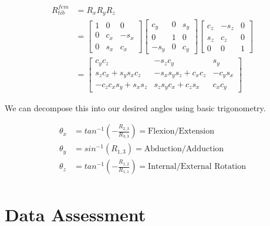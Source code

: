 \documentclass[10pt]{IEEEtran}
\begin{document}
    \begin{equation}
        \begin{aligned}
            R^{fem}_{tib} & = R_{x}R_{y}R_{z}\\
            &= \begin{bmatrix}1 & 0 & 0 \\ 0 & c_{x} & -s_{x} \\ 0 & s_{x} & c_{x} \end{bmatrix}
            \begin{bmatrix}c_{y} & 0 & s_{y}\\ 0 & 1 & 0 \\ -s_{y} & 0 & c_{y} \end{bmatrix}
            \begin{bmatrix} c_{z} & -s_{z} & 0 \\ s_{z} & c_{z} & 0 \\ 0 & 0 & 1 \end{bmatrix}\\
            &= \begin{bmatrix}
                c_{y}c_{z} & -s_{z}c_{y} & s_{y} \\
                s_{z}c_{x} + s_{y}s_{x}c_{z} & -s_{x}s_{y}s_{z} + c_{x}c_{z} & -c_{y}s_{x} \\
                -c_{z}c_{x}s_{y} + s_{x}s_{z} & s_{z}s_{y}c_{x} + c_{z}s_{x}  & c_{x}c_{y}
            \end{bmatrix}
        \end{aligned}
        \label{rot}
    \end{equation}

    We can decompose this into our desired angles using basic trigonometry.

    \begin{equation}
        \begin{aligned}
            \theta_{x} & = tan^{-1}(-\frac{R_{2,3}}{R_{3,3}}) = \text{Flexion/Extension}\\
            \theta_{y} &= sin^{-1}(R_{1,3}) = \text{Abduction/Adduction} \\
            \theta_{z} & = tan^{-1}(-\frac{R_{1,2}}{R_{1,1}}) = \text{Internal/External Rotation} \\
        \end{aligned}
    \end{equation}

    \section{Data Assessment}
\end{document}
